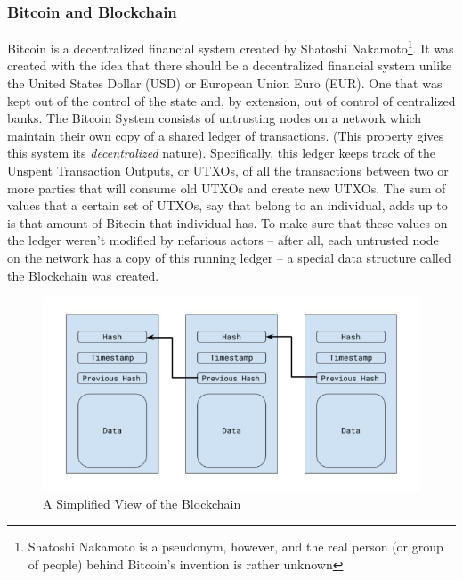 		\subsubsection{Bitcoin and Blockchain}
			\hspace{10mm}Bitcoin is a decentralized financial system created by Shatoshi Nakamoto\footnote{Shatoshi Nakamoto is a pseudonym, however, and the real person (or group of people) behind Bitcoin's invention is rather unknown}. It was created with the idea that there should be a decentralized financial system unlike the United States Dollar (USD) or European Union Euro (EUR). One that was kept out of the control of the state and, by extension, out of control of centralized banks. The Bitcoin System consists of untrusting nodes on a network which maintain their own copy of a shared ledger of transactions. (This property gives this system its \textit{decentralized} nature). Specifically, this ledger keeps track of the Unspent Transaction Outputs, or UTXOs, of all the transactions between two or more parties that will consume old UTXOs and create new UTXOs. The sum of values that a certain set of UTXOs, say that belong to an individual, adds up to is that amount of Bitcoin that individual has. To make sure that these values on the ledger weren't modified by nefarious actors -- after all, each untrusted node on the network has a copy of this running ledger -- a special data structure called the Blockchain was created.\\
			
		\begin{figure}[h!]
		\includegraphics[width=\textwidth]{./fabsec-report-introduction/blockchain-diagram-resized.jpg}
		\caption{A Simplified View of the Blockchain}
		\end{figure}
		
